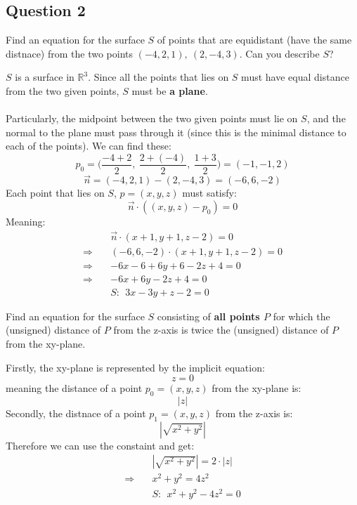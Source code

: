\documentclass{article}
\begin{document}
    \subsection*{Question 2}
    \begin{enumerate}[(a)]
        \begin{framed}
            \item Find an equation for the surface $S$ of points that are equidistant (have the same distnace) from the two points $(-4,2,1),\ (2,-4,3)$. Can you describe $S$?
        \end{framed}
        $S$ is a surface in $\mathbb{R}^3$. Since all the points that lies on $S$ must have equal distance from the two given points, $S$ must be \textbf{a plane}.\\\\
        Particularly, the midpoint between the two given points must lie on $S$, and the normal to the plane must pass through it (since this is the minimal distance to each of the points). We can find these:
        $$p_0 = \bigg(\frac{-4+2}{2},\ \frac{2+(-4)}{2},\ \frac{1+3}{2}\bigg) = (-1,-1,2)$$
        $$\vec{n} = (-4,2,1) - (2,-4,3) = (-6,6,-2)$$
        Each point that lies on $S$, $p = (x,y,z)$ must satisfy:
        $$\vec{n}\cdot((x,y,z) - p_0) = 0$$
        Meaning:
        \begin{align*}
            &\vec{n}\cdot(x+1,y+1,z-2) = 0\\
            \Rightarrow\quad&(-6,6,-2)\cdot(x+1,y+1,z-2) = 0\\
            \Rightarrow\quad&-6x-6+6y+6-2z+4 = 0\\
            \Rightarrow\quad&-6x + 6y -2z + 4 = 0\\
            &\boxed{S:\ \ 3x - 3y +z - 2 = 0}
        \end{align*}
        \begin{framed}
            \item Find an equation for the surface $S$ consisting of \textbf{all points $P$} for which the (unsigned) distance of $P$ from the z-axis is twice the (unsigned) distance of $P$ from the xy-plane.
        \end{framed}
        Firstly, the xy-plane is represented by the implicit equation:
        $$z=0$$
        meaning the distance of a point $p_0 = (x,y,z)$ from the xy-plane is:
        $$|z|$$
        Secondly, the distnace of a point $p_1 = (x,y,z)$ from the z-axis is:
        $$|\sqrt{x^2+y^2}|$$
        Therefore we can use the constaint and get:
        \begin{align*}
            &|\sqrt{x^2+y^2}| = 2\cdot|z|\\
            \Rightarrow\quad&x^2+y^2 = 4z^2\\
            &\boxed{S:\ \ x^2+y^2 - 4z^2 = 0}
        \end{align*}
    \end{enumerate}
\end{document}
